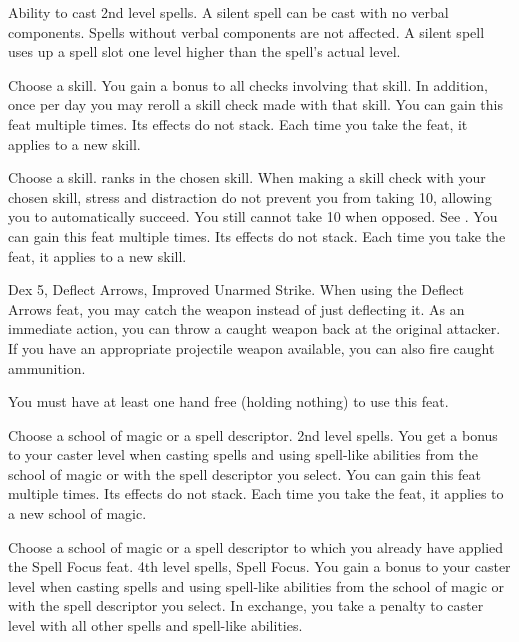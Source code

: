 \featpre Ability to cast 2nd level spells.
\featben A silent spell can be cast with no verbal components.
Spells without verbal components are not affected.
A silent spell uses up a spell slot one level higher than the spell's actual level.

Choose a skill.
\featben You gain a  bonus to all checks involving that skill.
In addition, once per day you may reroll a skill check made with that skill.
You can gain this feat multiple times.
Its effects do not stack.
Each time you take the feat, it applies to a new skill.

Choose a skill.
 ranks in the chosen skill.
\featben When making a skill check with your chosen skill, stress and distraction do not prevent you from taking 10, allowing you to automatically succeed.
You still cannot take 10 when opposed.
See .
You can gain this feat multiple times.
Its effects do not stack.
Each time you take the feat, it applies to a new skill.

\featpres
Dex 5, Deflect Arrows, Improved Unarmed Strike.
\featben When using the Deflect Arrows feat, you may catch the weapon instead of just deflecting it.
As an immediate action, you can throw a caught weapon back at the original attacker.
If you have an appropriate projectile weapon available, you can also fire caught ammunition.
\par You must have at least one hand free (holding nothing) to use this feat.

Choose a school of magic or a spell descriptor.
\featpre 2nd level spells.
\featben You get a  bonus to your caster level when casting spells and using spell-like abilities from the school of magic or with the spell descriptor you select.
You can gain this feat multiple times.
Its effects do not stack.
Each time you take the feat, it applies to a new school of magic.

Choose a school of magic or a spell descriptor to which you already have applied the Spell Focus feat.
\featpre 4th level spells, Spell Focus.
\featben You gain a  bonus to your caster level when casting spells and using spell-like abilities from the school of magic or with the spell descriptor you select.
In exchange, you take a  penalty to caster level with all other spells and spell-like abilities.

